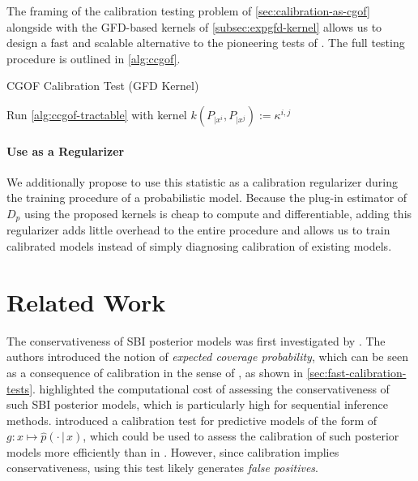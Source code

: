 \documentclass{uai2023} %
\begin{document}
The framing of the calibration testing problem of \cref{sec:calibration-as-cgof} alongside with the GFD-based kernels of \cref{subsec:expgfd-kernel} allows us to design a fast and scalable alternative to the pioneering tests of \citet{widmann2019calibration}.
The full testing procedure is outlined in \cref{alg:ccgof}.

\begin{algorithm}
    \DontPrintSemicolon
    \caption{CGOF Calibration Test (GFD Kernel)}\label{alg:ccgof}
    \BlankLine
    Run \cref{alg:ccgof-tractable} with kernel $k(P_{|x^i}, P_{|x^j}) := \kappa^{i,j}$\;
\end{algorithm}

\paragraph{Use as a Regularizer} 
We additionally propose to use this statistic as a calibration regularizer
during the training procedure of a probabilistic model. Because the plug-in
estimator of $ D_p $ using the proposed kernels is cheap to compute and
differentiable, adding this regularizer adds little overhead to the entire
procedure and allows us to train calibrated models instead of simply
diagnosing calibration of existing models.

\section{Related Work}\label{sec:related-work}

The conservativeness of SBI posterior models was first investigated by \citet{Hermans2021}.
The authors introduced the notion of \emph{expected coverage probability}, which can be seen as a consequence of calibration in the sense of \citet{vaicenavicius2019evaluating}, as shown in \cref{sec:fast-calibration-tests}.
\citet{Hermans2021} highlighted the computational cost of assessing the conservativeness of such SBI posterior models, which is particularly high for sequential inference methods.
\citet{widmann2022calibration} introduced a calibration test for predictive models of the form of $g \colon x \mapsto \widehat{p}(\cdot \,|\, x)$, which could be used to assess the calibration of such posterior models more efficiently than in \cite{Hermans2021}.
However, since calibration implies conservativeness, using this test likely generates \emph{false positives}.
\end{document}
